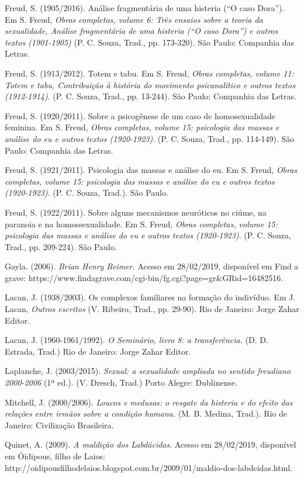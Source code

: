 Freud, S. (1905/2016). Análise fragmentária de uma histeria (``O caso
Dora''). Em S. Freud, \emph{Obras completas, volume 6: Três ensaios
sobre a teoria da sexualidade, Análise fragmentária de uma histeria (``O
caso Dora'') e outros textos (1901-1905)} (P. C. Souza, Trad., pp.
173-320). São Paulo: Companhia das Letras.

Freud, S. (1913/2012). Totem e tabu. Em S. Freud, \emph{Obras completas,
volume 11: Totem e tabu, Contribuição à história do movimento
psicanalítico e outros textos (1912-1914)}. (P. C. Souza, Trad., pp.
13-244). São Paulo: Companhia das Letras.

Freud, S. (1920/2011). Sobre a psicogênese de um caso de homosexualidade
feminina. Em S. Freud, \emph{Obras completas, volume 15: psicologia das
massas e análise do eu e outros textos (1920-1923)}. (P. C. Souza,
Trad., pp. 114-149). São Paulo: Companhia das Letras.

Freud, S. (1921/2011). Psicologia das massas e análise do eu. Em S.
Freud, \emph{Obras completas, volume 15: psicologia das massas e análise
do eu e outros textos (1920-1923)}. (P. C. Souza, Trad.). São Paulo.

Freud, S. (1922/2011). Sobre alguns mecanismos neuróticos no ciúme, na
paranoia e na homossexualidade. Em S. Freud, \emph{Obras completas,
volume 15: psicologia das massas e análise do eu e outros textos
(1920-1923)}. (P. C. Souza, Trad., pp. 209-224). São Paulo.

Gayla. (2006). \emph{Brian Henry Reimer.} Acesso em 28/02/2019,
disponível em Find a grave:
https://www.findagrave.com/cgi-bin/fg.cgi?page=gr\&GRid=16482516.

Lacan, J. (1938/2003). Os complexos familiares na formação do indivíduo.
Em J. Lacan, \emph{Outros escritos} (V. Ribeiro, Trad., pp. 29-90). Rio
de Janeiro: Jorge Zahar Editor.

Lacan, J. (1960-1961/1992). \emph{O Seminário, livro 8: a
transferência.} (D. D. Estrada, Trad.) Rio de Janeiro: Jorge Zahar
Editor.

Laplanche, J. (2003/2015). \emph{Sexual: a sexualidade ampliada no
sentido freudiano 2000-2006} (1ª ed.). (V. Dresch, Trad.) Porto Alegre:
Dublinense.

Mitchell, J. (2000/2006). \emph{Loucos e medusas: o resgate da histeria
e do efeito das relações entre irmãos sobre a condição humana.} (M. B.
Medina, Trad.). Rio de Janeiro: Civilização Brasileira.

Quinet, A. (2009). \emph{A maldição dos Labdácidas}. Acesso em
28/02/2019, disponível em Óidipous, filho de Laios:
http://oidipousfilhodelaios.blogspot.com.br/2009/01/maldio-dos-labdcidas.html.

